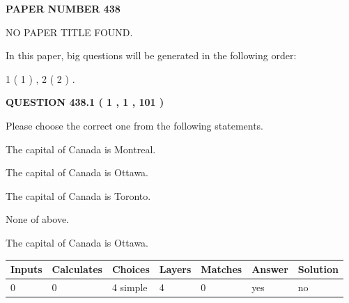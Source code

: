 \documentclass[12pt]{article}
\begin{document}
   
   
   
\newpage 
\setcounter{page}{ 
   438001 } 
   
   
   
   
 {\textbf{ \Large{ PAPER NUMBER  438  }}}
   
   
\vspace{0.2in}
   
   
   
   
   
   
 NO PAPER TITLE FOUND.
   
   
   
\vspace{0.2in}
   
In this paper, big questions will be generated in the following order: 
   
   
   1 ( 1 )
 ,
   2 ( 2 )
 .
  
\vspace{0.2in}
  
{\textbf{\Large{QUESTION
438.1 
 ( 1 , 1 , 101 )
}}}
  
  
Please choose the correct one from the following statements.
 
 
The capital of Canada is Montreal.
 
 
The capital of Canada is Ottawa.
 
 
The capital of Canada is Toronto.
 
 
 None of above.
 
 
\noindent{}
 
 
The capital of Canada is Ottawa.
 
 
\noindent{}
 
 
   
   
   
   
\noindent\begin{tabular}{|l|l|l|l|l|l|l|}
 \hline
Inputs & Calculates & Choices & Layers & Matches & Answer & Solution \\ \hline
 0  & 
 0  & 
 4
  simple  
  & 
 4  & 
 0  & 
  yes & 
  no 
  \\ \hline
 \end{tabular}
   
\end{document}
